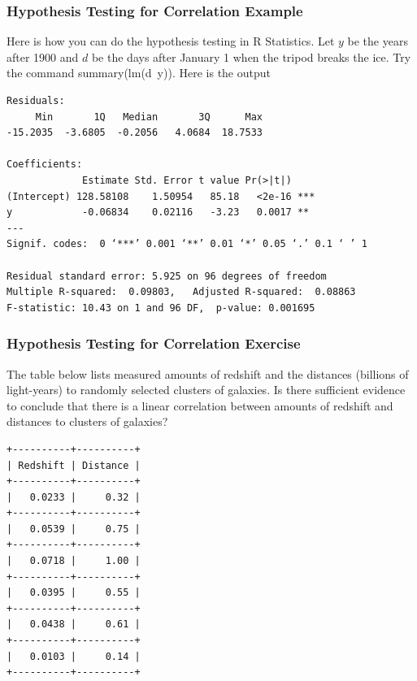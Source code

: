 \documentclass[xcolor=dvipsnames]{beamer}
\begin{document}
\begin{frame}
  \frametitle{Hypothesis Testing for Correlation Example}
  Here is how you can do the hypothesis testing in R Statistics.
  Let $y$ be the years after 1900 and $d$ be the days after January 1
  when the tripod breaks the ice. Try the command
  \textrm{summary(lm(d~y))}. Here is the output
\begin{verbatim}
Residuals:
     Min       1Q   Median       3Q      Max 
-15.2035  -3.6805  -0.2056   4.0684  18.7533 

Coefficients:
             Estimate Std. Error t value Pr(>|t|)    
(Intercept) 128.58108    1.50954   85.18   <2e-16 ***
y            -0.06834    0.02116   -3.23   0.0017 ** 
---
Signif. codes:  0 ‘***’ 0.001 ‘**’ 0.01 ‘*’ 0.05 ‘.’ 0.1 ‘ ’ 1

Residual standard error: 5.925 on 96 degrees of freedom
Multiple R-squared:  0.09803,	Adjusted R-squared:  0.08863 
F-statistic: 10.43 on 1 and 96 DF,  p-value: 0.001695
\end{verbatim}
\end{frame}

\begin{frame}[fragile]
  \frametitle{Hypothesis Testing for Correlation Exercise}
  {\ubung} The table below lists measured amounts of redshift and
  the distances (billions of light-years) to randomly selected
  clusters of galaxies. Is there sufficient evidence to conclude
  that there is a linear correlation between amounts of redshift
  and distances to clusters of galaxies?
  \begin{footnotesize}
\begin{verbatim}
+----------+----------+
| Redshift | Distance |
+----------+----------+
|   0.0233 |     0.32 |
+----------+----------+
|   0.0539 |     0.75 |
+----------+----------+
|   0.0718 |     1.00 |
+----------+----------+
|   0.0395 |     0.55 |
+----------+----------+
|   0.0438 |     0.61 |
+----------+----------+
|   0.0103 |     0.14 |
+----------+----------+
\end{verbatim}
  \end{footnotesize}
\end{frame}
\end{document}
